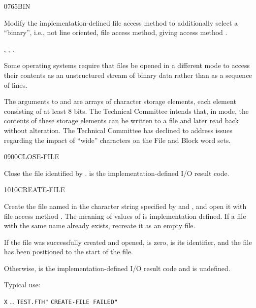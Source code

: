 \begin{worddef}{0765}{BIN}
\item {}

	Modify the implementation-defined file access method
	 to additionally select a ``binary'', i.e., not
	line oriented, file access method, giving access method
	.

\see {},
	,
	.

	\begin{defer}
	\rationale %
		Some operating systems require that files be opened in a
		different mode to access their contents as an unstructured
		stream of binary data rather than as a sequence of lines.

		The arguments to  and  are
		arrays of character storage elements, each element consisting
		of at least 8 bits. The Technical Committee intends that, in
		 mode, the contents of these storage elements can be
		written to a file and later read back without alteration. The
		Technical Committee has declined to address issues regarding
		the impact of ``wide'' characters on the File and Block word
		sets.
	\end{defer}
\end{worddef}


\begin{worddef}{0900}{CLOSE-FILE}
\item {}

	Close the file identified by .  is the
	implementation-defined I/O result code.
\end{worddef}


\begin{worddef}{1010}{CREATE-FILE}
\item {}

	Create the file named in the character string specified by
	 and , and open it with file access method
	. The meaning of values of  is
	implementation defined. If a file with the same name already
	exists, recreate it as an empty file.

	If the file was successfully created and opened,  is
	zero,  is its identifier, and the file has been
	positioned to the start of the file.

	Otherwise,  is the implementation-defined I/O result
	code and  is undefined.

	\begin{defer}
	\rationale %
		Typical use:

		\tab \word[core]{:} \texttt{X} {\ldots}
				 \texttt{TEST.FTH"} \word{R/W}
				\word{CREATE-FILE}
				 \texttt{CREATE-FILE FAILED"}
			\word[core]{;}
	\end{defer}
\end{worddef}



